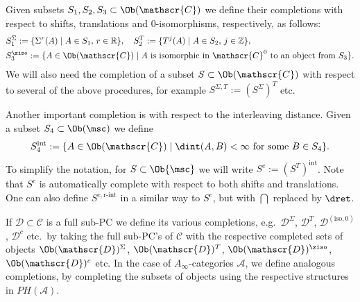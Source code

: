 Given subsets $S_1, S_2, S_3 \subset \Ob(\mathscr{C})$ we define
their completions with respect to shifts, translations and
$0$-isomorphisms, respectively, as follows:
\begin{equation}
  \begin{aligned}
    & S_1^{\Sigma} := \{ \Sigma^r(A) \mid A \in S_1, \, r \in
    \mathbb{R}\}, \quad
    S_2^{T} := \{T^j(A) \mid A \in S_2, \, j \in \mathbb{Z}\}, \\
    & S_3^{\ziso} := \{ A \in \Ob(\mathscr{C}) \mid A \text{ is
      isomorphic in } \mathscr{C}^0 \text{ to an object from } S_3\}.
  \end{aligned}
\end{equation}
We will also need the completion of a subset
$S \subset \Ob(\mathscr{C})$ with respect to several of the above
procedures, for example $S^{\Sigma, T} := (S^{\Sigma})^T$ etc.

Another important completion is with respect to the interleaving
distance. Given a subset $S_4 \subset \Ob(\msc)$ we define
$$S_4^{\text{int}} :=
\{ A \in \Ob(\mathscr{C}) \mid \dint(A, B) < \infty \text{ for some }
B \in S_4\}.$$ To simplify the notation, for $S \subset \Ob{\msc}$ we
will write $S^{c} := (S^{T})^{\text{int}}$.
Note that $S^c$ is automatically complete with respect to both shifts
and translations.
One can also define $S^{c,\text{r-int}}$ in a similar way to $S^c$,
but with $\dint$ replaced by $\dret$.

If $\mathscr{D} \subset \mathscr{C}$ is a full sub-PC we define its
various completions, e.g.~$\mathscr{D}^{\Sigma}$, $\mathscr{D}^{T}$,
$\mathscr{D}^{(\text{iso}, 0)}$, $\mathscr{D}^{c}$ etc.~by taking the
full sub-PC's of $\mathscr{C}$ with the respective completed sets of
objects $\Ob(\mathscr{D})^{\Sigma}$, $\Ob(\mathscr{D})^{T}$,
$\Ob(\mathscr{D})^{\ziso}$, $\Ob(\mathscr{D})^{c}$ etc. In the case of
$A_{\infty}$-categories $\mathcal{A}$, we define analogous
completions, by completing the subsets of objects using the respective
structures in $PH(\mathcal{A})$.
